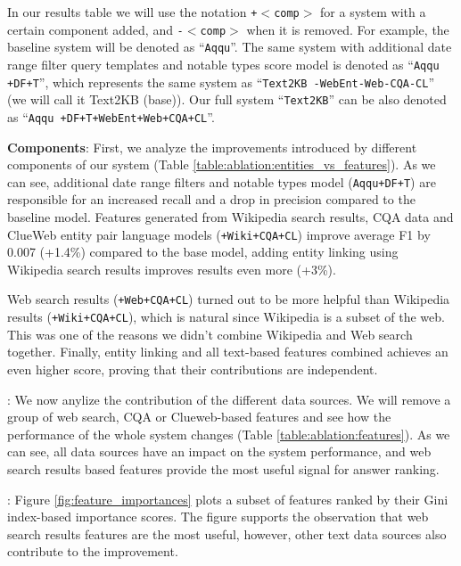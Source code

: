 In our results table we will use the notation \texttt{+$<$comp$>$} for a system with a certain component added, and \texttt{-$<$comp$>$} when it is removed.
For example, the baseline system will be denoted as ``\texttt{Aqqu}''.
The same system with additional date range filter query templates and notable types score model is denoted as ``\texttt{Aqqu +DF+T}'', which represents the same system as ``\texttt{Text2KB -WebEnt-Web-CQA-CL}'' (we will call it Text2KB (base)).
Our full system ``\texttt{Text2KB}'' can be also denoted as ``\texttt{Aqqu +DF+T+WebEnt+Web+CQA+CL}''.

\noindent\textbf{Components}: First, we analyze the improvements introduced by different components of our system (Table \ref{table:ablation:entities_vs_features}).
As we can see, additional date range filters and notable types model (\texttt{Aqqu+DF+T}) are responsible for an increased recall and a drop in precision compared to the baseline model.
Features generated from Wikipedia search results, CQA data and ClueWeb entity pair language models (\texttt{+Wiki+CQA+CL}) improve average F1 by 0.007 (+1.4\%) compared to the base model, adding entity linking using Wikipedia search results improves results even more (+3\%).

Web search results (\texttt{+Web+CQA+CL}) turned out to be more helpful than Wikipedia results (\texttt{+Wiki+CQA+CL}), which is natural since Wikipedia is a subset of the web.
This was one of the reasons we didn't combine Wikipedia and Web search together.
Finally, entity linking and all text-based features combined achieves an even higher score, proving that their contributions are independent.

: We now anylize the contribution of the different data sources.
We will remove a group of web search, CQA or Clueweb-based features and see how the performance of the whole system changes (Table \ref{table:ablation:features}).
As we can see, all data sources have an impact on the system performance, and web search results based features provide the most useful signal for answer ranking.

:
Figure \ref{fig:feature_importances} plots a subset of features ranked by their Gini index-based importance scores.
The figure supports the observation that web search results features are the most useful, however, other text data sources also contribute to the improvement.

